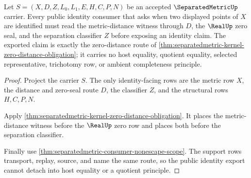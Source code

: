 \begin{theorem}
\label{thm:separatedmetric-public-identity-export}
Let $S=(X,D,Z,L_0,L_1,E,H,C,P,N)$ be an accepted $\SeparatedMetricUp$ carrier. Every public identity consumer that asks when two displayed points of $X$ are identified must read the metric-distance witness through $D$, the $\RealUp$ zero seal, and the separation classifier $Z$ before exposing an identity claim. The exported claim is exactly the zero-distance route of \autoref{thm:separatedmetric-kernel-zero-distance-obligation}; it carries no host equality, quotient equality, selected representative, trichotomy row, or ambient completeness principle.
\end{theorem}
\begin{proof}
Project the carrier $S$. The only identity-facing rows are the metric row $X$, the distance and zero-seal route $D$, the classifier $Z$, and the structural rows $H,C,P,N$.

Apply \autoref{thm:separatedmetric-kernel-zero-distance-obligation}. It places the metric-distance witness before the $\RealUp$ zero row and places both before the separation classifier.

Finally use \autoref{thm:separatedmetric-consumer-nonescape-scope}. The support rows transport, replay, source, and name the same route, so the public identity export cannot detach into host equality or a quotient principle.
\end{proof}

